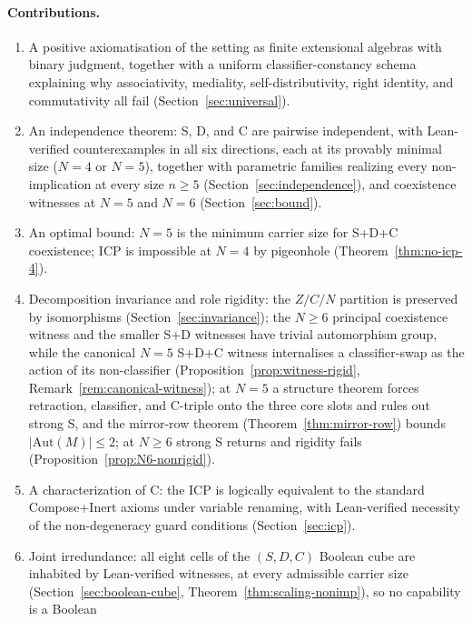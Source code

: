\documentclass[sigconf,screen]{acmart}
\theoremstyle{remark}
\begin{document}
\paragraph{Contributions.}
\begin{enumerate}
  \item A positive axiomatisation of the setting as finite extensional
    algebras with binary judgment, together with a uniform
    classifier-constancy schema explaining why associativity, mediality,
    self-distributivity, right identity, and commutativity all fail
    (Section~\ref{sec:universal}).
  \item An independence theorem: S, D, and C are pairwise independent,
    with Lean-verified counterexamples in all six directions, each at its
    provably minimal size ($N = 4$ or $N = 5$), together with parametric
    families realizing every non-implication at every size $n \geq 5$
    (Section~\ref{sec:independence}), and coexistence witnesses at
    $N = 5$ and $N = 6$ (Section~\ref{sec:bound}).
  \item An optimal bound: $N = 5$ is the minimum carrier size for S+D+C
    coexistence; ICP is impossible at $N = 4$ by pigeonhole
    (Theorem~\ref{thm:no-icp-4}).
  \item Decomposition invariance and role rigidity: the $Z/C/N$ partition
    is preserved by isomorphisms (Section~\ref{sec:invariance}); the
    $N \geq 6$ principal coexistence witness and the smaller S+D witnesses
    have trivial automorphism group, while the canonical $N = 5$ S+D+C
    witness internalises a classifier-swap as the action of its
    non-classifier (Proposition~\ref{prop:witness-rigid},
    Remark~\ref{rem:canonical-witness}); at $N = 5$ a structure theorem
    forces retraction, classifier, and C-triple onto the three core slots
    and rules out strong S, and the mirror-row theorem
    (Theorem~\ref{thm:mirror-row}) bounds $|\mathrm{Aut}(M)| \leq 2$;
    at $N \geq 6$ strong S returns and rigidity fails
    (Proposition~\ref{prop:N6-nonrigid}).
  \item A characterization of C: the ICP is logically equivalent to the
    standard Compose+Inert axioms under variable renaming, with
    Lean-verified necessity of the non-degeneracy guard conditions
    (Section~\ref{sec:icp}).
  \item Joint irredundance: all eight cells of the $(S, D, C)$ Boolean
    cube are inhabited by Lean-verified witnesses, at every admissible
    carrier size (Section~\ref{sec:boolean-cube},
    Theorem~\ref{thm:scaling-nonimp}), so no capability is a Boolean

\end{enumerate}
\end{document}
